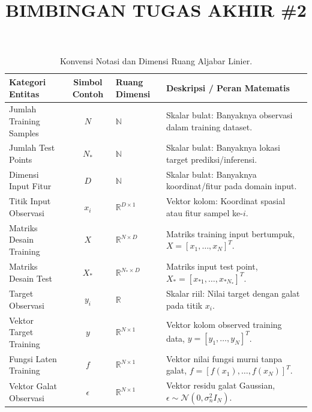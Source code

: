 \documentclass[11pt,a4paper]{article}
\title{
    \vspace{-1.2cm}
    \textbf{\Large BIMBINGAN TUGAS AKHIR \#2} \\[0.2em]
}
\def\boldsymbol#1{#1}%
\def\mathbf#1{#1}%
\begin{document}
\maketitle
\vspace{-0.6cm}

\begin{table}[h!]
\centering
\small
\caption{Konvensi Notasi dan Dimensi Ruang Aljabar Linier.}
\label{tab:notasi}
\begin{tabularx}{\textwidth}{l c l X}
\toprule
\textbf{Kategori Entitas} & \textbf{Simbol Contoh} & \textbf{Ruang Dimensi} & \textbf{Deskripsi / Peran Matematis} \\
\midrule
Jumlah Training Samples & $N$ & $\mathbb{N}$ & Skalar bulat: Banyaknya observasi dalam training dataset. \\
Jumlah Test Points & $N_*$ & $\mathbb{N}$ & Skalar bulat: Banyaknya lokasi target prediksi/inferensi. \\
Dimensi Input Fitur & $D$ & $\mathbb{N}$ & Skalar bulat: Banyaknya koordinat/fitur pada domain input. \\
\midrule
Titik Input Observasi & $\mathbf{x}_i$ & $\mathbb{R}^{D \times 1}$ & Vektor kolom: Koordinat spasial atau fitur sampel ke-$i$. \\
Matriks Desain Training & $X$ & $\mathbb{R}^{N \times D}$ & Matriks training input bertumpuk, $X = [\mathbf{x}_1, \dots, \mathbf{x}_N]^T$. \\
Matriks Desain Test & $X_*$ & $\mathbb{R}^{N_* \times D}$ & Matriks input test point, $X_* = [\mathbf{x}_{*1}, \dots, \mathbf{x}_{*N_*}]^T$. \\
\midrule
Target Observasi & $y_i$ & $\mathbb{R}$ & Skalar riil: Nilai target dengan galat pada titik $\mathbf{x}_i$. \\
Vektor Target Training & $\mathbf{y}$ & $\mathbb{R}^{N \times 1}$ & Vektor kolom observed training data, $\mathbf{y} = [y_1, \dots, y_N]^T$. \\
Fungsi Laten Training & $\mathbf{f}$ & $\mathbb{R}^{N \times 1}$ & Vektor nilai fungsi murni tanpa galat, $\mathbf{f} = [f(\mathbf{x}_1), \dots, f(\mathbf{x}_N)]^T$. \\
Vektor Galat Observasi & $\boldsymbol{\epsilon}$ & $\mathbb{R}^{N \times 1}$ & Vektor residu galat Gaussian, $\boldsymbol{\epsilon} \sim \mathcal{N}(\mathbf{0}, \sigma_n^2 I_N)$. \\

\end{tabularx}
\end{table}
\end{document}
